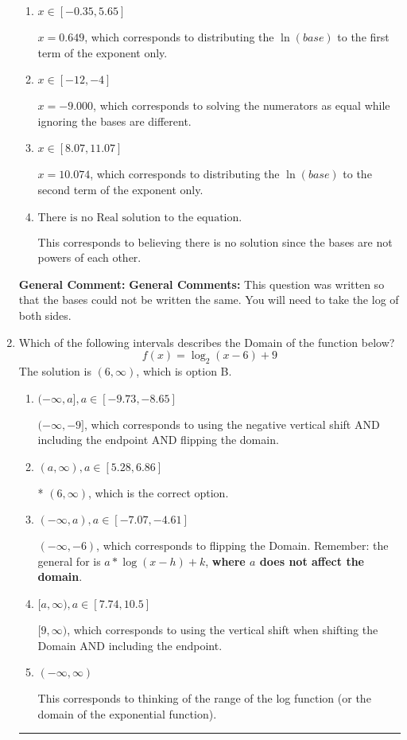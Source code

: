 \documentclass{extbook}[14pt]
\newcommand{\litem}[1]{\item #1

\rule{\textwidth}{0.4pt}}
\begin{document}
\begin{enumerate}
{\begin{enumerate}[label=\Alph*.]
* $x = -0.726$, which is the correct option.
\item \( x \in [-0.35, 5.65] \)

$x = 0.649$, which corresponds to distributing the $\ln(base)$ to the first term of the exponent only.
\item \( x \in [-12, -4] \)

$x = -9.000$, which corresponds to solving the numerators as equal while ignoring the bases are different.
\item \( x \in [8.07, 11.07] \)

$x = 10.074$, which corresponds to distributing the $\ln(base)$ to the second term of the exponent only.
\item \( \text{There is no Real solution to the equation.} \)

This corresponds to believing there is no solution since the bases are not powers of each other.
\end{enumerate}

\textbf{General Comment:} \textbf{General Comments:} This question was written so that the bases could not be written the same. You will need to take the log of both sides.
}
\litem{
Which of the following intervals describes the Domain of the function below?
\[ f(x) = \log_2{(x-6)}+9 \]The solution is \( (6, \infty) \), which is option B.\begin{enumerate}[label=\Alph*.]
\item \( (-\infty, a], a \in [-9.73, -8.65] \)

$(-\infty, -9]$, which corresponds to using the negative vertical shift AND including the endpoint AND flipping the domain.
\item \( (a, \infty), a \in [5.28, 6.86] \)

* $(6, \infty)$, which is the correct option.
\item \( (-\infty, a), a \in [-7.07, -4.61] \)

$(-\infty, -6)$, which corresponds to flipping the Domain. Remember: the general for is $a*\log(x-h)+k$, \textbf{where $a$ does not affect the domain}.
\item \( [a, \infty), a \in [7.74, 10.5] \)

$[9, \infty)$, which corresponds to using the vertical shift when shifting the Domain AND including the endpoint.
\item \( (-\infty, \infty) \)

This corresponds to thinking of the range of the log function (or the domain of the exponential function).
\end{enumerate}

}
\end{enumerate}
\end{document}
